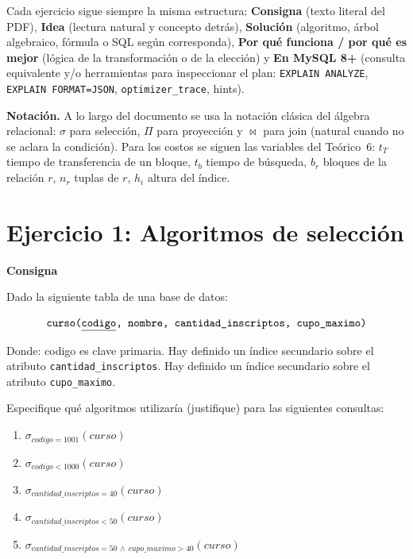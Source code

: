 \documentclass[11pt,a4paper]{article}
\newcommand{\sel}[1]{\sigma_{#1}}
\newcommand{\itemcabecera}[1]{\noindent\textbf{#1}\par\medskip}
\newcommand{\bloqueConsigna}{\itemcabecera{Consigna}}
\begin{document}
Cada ejercicio sigue siempre la misma estructura: \textbf{Consigna} (texto literal del PDF), \textbf{Idea} (lectura natural y concepto detrás), \textbf{Solución} (algoritmo, árbol algebraico, fórmula o SQL según corresponda), \textbf{Por qué funciona / por qué es mejor} (lógica de la transformación o de la elección) y \textbf{En MySQL 8+} (consulta equivalente y/o herramientas para inspeccionar el plan: \texttt{EXPLAIN ANALYZE}, \texttt{EXPLAIN FORMAT=JSON}, \texttt{optimizer\_trace}, hints).

\begin{nota}
\textbf{Notación.} A lo largo del documento se usa la notación clásica del álgebra relacional: $\sigma$ para selección, $\Pi$ para proyección y $\bowtie$ para join (natural cuando no se aclara la condición). Para los costos se siguen las variables del Teórico~6: $t_T$ tiempo de transferencia de un bloque, $t_b$ tiempo de búsqueda, $b_r$ bloques de la relación $r$, $n_r$ tuplas de $r$, $h_i$ altura del índice.
\end{nota}

\section{Ejercicio 1: Algoritmos de selección}

\bloqueConsigna

Dado la siguiente tabla de una base de datos:

\[\texttt{curso(\underline{codigo}, nombre, cantidad\_inscriptos, cupo\_maximo)}\]

Donde: codigo es clave primaria. Hay definido un índice secundario sobre el atributo \texttt{cantidad\_inscriptos}. Hay definido un índice secundario sobre el atributo \texttt{cupo\_maximo}.

Especifique qué algoritmos utilizaría (justifique) para las siguientes consultas:

\begin{enumerate}[label=\alph*),leftmargin=*]
    \item $\sel{codigo = 1001}(curso)$
    \item $\sel{codigo < 1000}(curso)$
    \item $\sel{cantidad\_inscriptos = 40}(curso)$
    \item $\sel{cantidad\_inscriptos < 50}(curso)$
    \item $\sel{cantidad\_inscriptos = 50 \,\wedge\, cupo\_maximo > 40}(curso)$
\end{enumerate}
\end{document}
